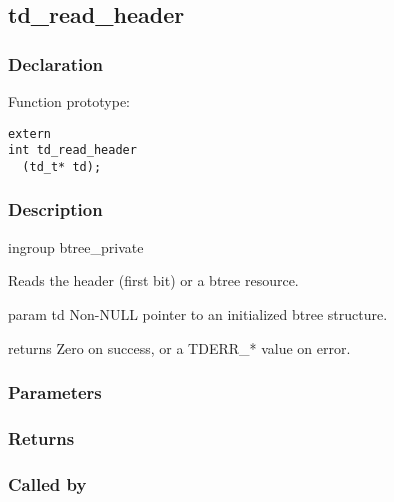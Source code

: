 
\newpage
\subsection{td\_read\_header}
\subsubsection{Declaration} Function prototype:

\begin{verbatim}
extern
int td_read_header
  (td_t* td);
\end{verbatim}

\subsubsection{Description}


 ingroup btree\_private

 Reads the header (first bit) or a btree resource.

 param td Non-NULL pointer to an initialized btree structure.

 returns Zero on success, or a TDERR\_* value on error.
 

\subsubsection{Parameters}
\subsubsection{Returns}
\subsubsection{Called by}
